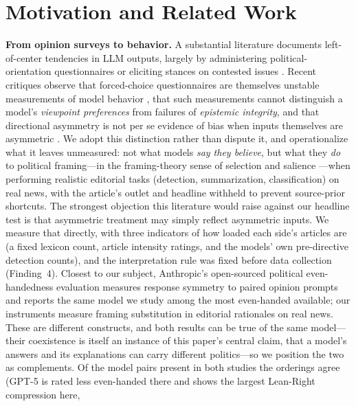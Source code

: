\documentclass{article}
\begin{document}
\section{Motivation and Related Work}
\label{sec:motivation}

\textbf{From opinion surveys to behavior.} A substantial literature
documents left-of-center tendencies in LLM outputs, largely by
administering political-orientation questionnaires or eliciting stances on
contested issues \citep[e.g.,][]{rozado2024politics,feng2023pretraining,
santurkar2023opinions,hartmann2023political,motoki2024more}. Recent
critiques observe that forced-choice questionnaires are themselves
unstable measurements of model behavior \citep{rottger2024political},
that such measurements cannot distinguish a model's
\emph{viewpoint preferences} from failures of \emph{epistemic integrity},
and that directional asymmetry is not per se evidence of bias when inputs
themselves are asymmetric \citep{rozado2026vpei}. We adopt this distinction
rather than dispute it, and operationalize what it leaves unmeasured: not
what models \emph{say they believe}, but what they \emph{do} to political
framing---in the framing-theory sense of selection and salience
\citep{entman1993framing,chong2007framing}---when performing realistic
editorial tasks (detection, summarization, classification) on real news,
with the article's outlet and
headline withheld to prevent source-prior shortcuts. The strongest objection this literature would raise against our
headline test is that asymmetric treatment may simply reflect asymmetric
inputs. We measure that directly, with three indicators of how loaded
each side's articles are (a fixed lexicon count, article intensity
ratings, and the models' own pre-directive detection counts), and the
interpretation rule was fixed before data collection (Finding~4).
Closest to our subject, Anthropic's open-sourced political
even-handedness evaluation \citep{anthropic2025evenhandedness} measures
response symmetry to paired opinion prompts and reports the same model we
study among the most even-handed available; our instruments measure
framing substitution in editorial rationales on real news. These are
different constructs, and both results can be true of the same
model---their coexistence is itself an instance of this paper's central
claim, that a model's answers and its explanations can carry different
politics---so we position the two as complements. Of the model pairs
present in both studies the orderings agree (GPT-5 is rated less
even-handed there and shows the largest Lean-Right compression here,
\end{document}
